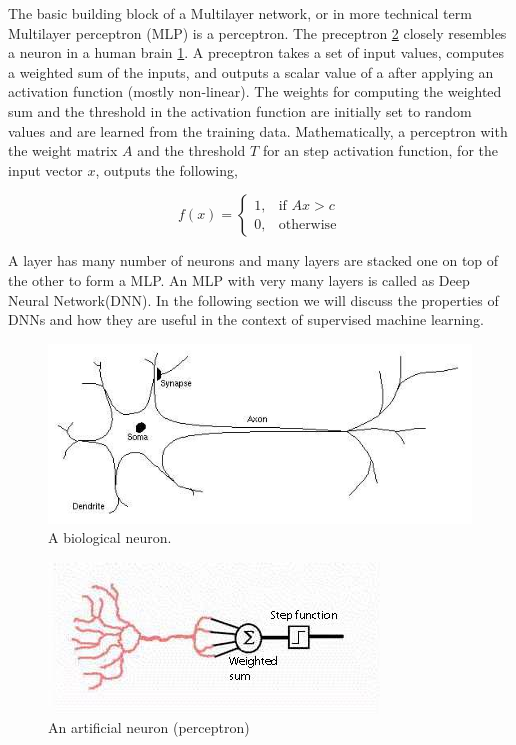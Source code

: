 \documentclass[a4paper]{article}
\begin{document}
The  basic  building block of a  Multilayer network, or  in more technical  term
Multilayer  perceptron  (MLP)  is a  perceptron.  The  preceptron  \ref{fig:ann}
closely resembles a neuron in a human brain \ref{fig:neuron}. A preceptron takes
a set of input  values,  computes a weighted sum of  the  inputs, and outputs  a
scalar value of a after applying an activation function (mostly non-linear). The
weights for  computing  the  weighted  sum and  the threshold  in the activation
function  are initially  set to random values and are learned  from the training
data. Mathematically, a perceptron with the  weight matrix $A$ and the threshold
$T$  for  an  step activation function, for the  input vector $x$,  outputs  the
following,


\[
  f(x)=
  \begin{cases}
    1, & \text{if }  A x > c \\
    0, & \text{otherwise}
  \end{cases}
\]


A layer has many number of neurons and many layers are stacked one on top of the
other to form a MLP. An  MLP  with very  many layers is  called  as Deep  Neural
Network(DNN). In the following section we will discuss  the properties  of  DNNs
and how they are useful in the context of supervised machine learning.


\begin{figure}
  \includegraphics[width=.99\linewidth]{img/bioneuron.jpg}
  \caption{A biological neuron.}
  \label{fig:neuron}
\end{figure}

\begin{figure}
  \includegraphics[width=.99\linewidth]{img/artificial.jpg}
  \caption{ An artificial neuron (perceptron)}
  \label{fig:ann}
\end{figure}
\end{document}
